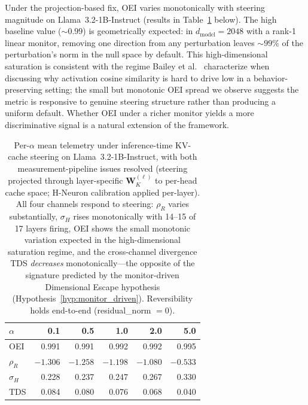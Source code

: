 Under the projection-based fix, OEI varies monotonically with steering magnitude on Llama~3.2-1B-Instruct (results in Table~\ref{tab:oei-alpha-sweep} below). The high baseline value (${\sim}0.99$) is geometrically expected: in $d_{\text{model}} = 2048$ with a rank-1 linear monitor, removing one direction from any perturbation leaves ${\sim}99\%$ of the perturbation's norm in the null space by default. This high-dimensional saturation is consistent with the regime Bailey et al.~\cite{bailey2024obfuscated} characterize when discussing why activation cosine similarity is hard to drive low in a behavior-preserving setting; the small but monotonic OEI spread we observe suggests the metric is responsive to genuine steering structure rather than producing a uniform default. Whether OEI under a richer monitor yields a more discriminative signal is a natural extension of the framework.

\begin{table}[h]
\centering
\small
\begin{tabular}{@{}lrrrrr@{}}
\toprule
$\alpha$ & 0.1 & 0.5 & 1.0 & 2.0 & 5.0 \\
\midrule
OEI & 0.991 & 0.991 & 0.992 & 0.992 & 0.995 \\
$\rho_R$ & $-1.306$ & $-1.258$ & $-1.198$ & $-1.080$ & $-0.533$ \\
$\sigma_H$ & 0.228 & 0.237 & 0.247 & 0.267 & 0.330 \\
TDS & 0.084 & 0.080 & 0.076 & 0.068 & 0.040 \\
\bottomrule
\end{tabular}
\caption{Per-$\alpha$ mean telemetry under inference-time KV-cache steering on Llama~3.2-1B-Instruct, with both measurement-pipeline issues resolved (steering projected through layer-specific $\mathbf{W}_K^{(\ell)}$ to per-head cache space; H-Neuron calibration applied per-layer). All four channels respond to steering: $\rho_R$ varies substantially, $\sigma_H$ rises monotonically with 14--15 of 17 layers firing, OEI shows the small monotonic variation expected in the high-dimensional saturation regime, and the cross-channel divergence TDS \emph{decreases} monotonically---the opposite of the signature predicted by the monitor-driven Dimensional Escape hypothesis (Hypothesis~\ref{hyp:monitor_driven}). Reversibility holds end-to-end (residual\_norm $= 0$).}
\label{tab:oei-alpha-sweep}
\end{table}

